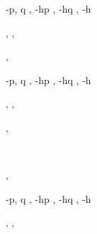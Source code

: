 \documentclass[a4paper]{article}
\begin{document}
\begin{alectryon}
\begin{sentence}
\begin{output}
      \begin{goals}
        \begin{goal}
          \begin{hyps}
            \hyp{p, q}{}
            \sep
            \hyp{hp}{}
            \sep
            \hyp{hq}{}
            \sep
            \hyp{h}{~~}
          \end{hyps}
          \sep
          \sep
          \begin{conclusion}
          \end{conclusion}
        \end{goal}
        \sep
        \begin{extragoals}
          \begin{goal}
            \begin{hyps}
              \hyp{p, q}{}
              \sep
              \hyp{hp}{}
              \sep
              \hyp{hq}{}
              \sep
              \hyp{h}{~~}
            \end{hyps}
            \sep
            \sep
            \begin{conclusion}
            \end{conclusion}
          \end{goal}
        \end{extragoals}
      \end{goals}
    \end{output}
  \end{sentence}
  \sep
  \begin{sentence}
    \begin{input}
      ~~~~
    \end{input}
    \sep
    \begin{output}
      \begin{goals}
        \begin{goal}
          \begin{hyps}
            \hyp{p, q}{}
            \sep
            \hyp{hp}{}
            \sep
            \hyp{hq}{}
            \sep
            \hyp{h}{~~}
          \end{hyps}
          \sep
          \sep
          \begin{conclusion}

\end{conclusion}
\end{goal}
\end{goals}
\end{output}
\end{sentence}
\end{alectryon}
\end{document}
